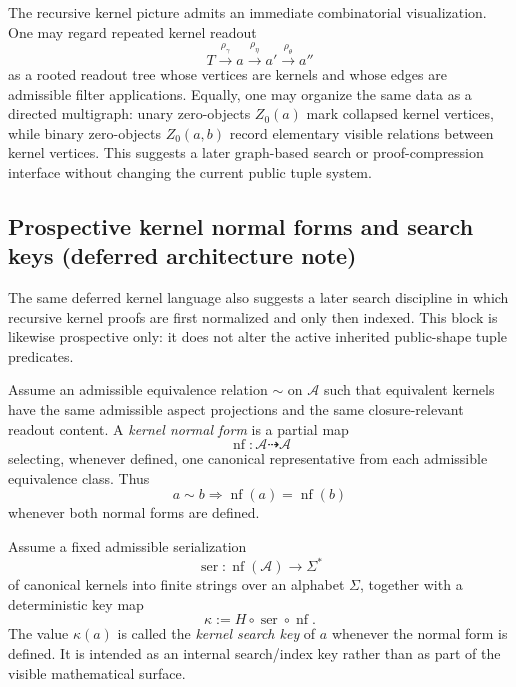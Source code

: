 \begin{remark}\label{rem:qam-zero-graph}
The recursive kernel picture admits an immediate combinatorial visualization. One may regard repeated kernel readout
\[
T \xrightarrow{\rho_\gamma} a \xrightarrow{\rho_\eta} a' \xrightarrow{\rho_\theta} a''
\]
as a rooted readout tree whose vertices are kernels and whose edges are admissible filter applications. Equally, one may organize the same data as a directed multigraph: unary zero-objects $Z_0(a)$ mark collapsed kernel vertices, while binary zero-objects $Z_0(a,b)$ record elementary visible relations between kernel vertices. This suggests a later graph-based search or proof-compression interface without changing the current public tuple system.
\end{remark}


\subsection*{Prospective kernel normal forms and search keys (deferred architecture note)}

The same deferred kernel language also suggests a later search discipline in which recursive kernel proofs are first normalized and only then indexed. This block is likewise prospective only: it does not alter the active inherited public-shape tuple predicates.

\begin{definition}\label{def:qam-kernel-normal-form}
Assume an admissible equivalence relation $\sim$ on $\mathcal A$ such that equivalent kernels have the same admissible aspect projections and the same closure-relevant readout content. A \emph{kernel normal form} is a partial map
\[
\operatorname{nf}:\mathcal A \dashrightarrow \mathcal A
\]
selecting, whenever defined, one canonical representative from each admissible equivalence class. Thus
\[
a\sim b \Longrightarrow \operatorname{nf}(a)=\operatorname{nf}(b)
\]
whenever both normal forms are defined.
\end{definition}

\begin{definition}\label{def:qam-kernel-key}
Assume a fixed admissible serialization
\[
\operatorname{ser}:\operatorname{nf}(\mathcal A)\to \Sigma^*
\]
of canonical kernels into finite strings over an alphabet $\Sigma$, together with a deterministic key map
\[
\kappa := H\circ \operatorname{ser}\circ \operatorname{nf}.
\]
The value $\kappa(a)$ is called the \emph{kernel search key} of $a$ whenever the normal form is defined. It is intended as an internal search/index key rather than as part of the visible mathematical surface.
\end{definition}

